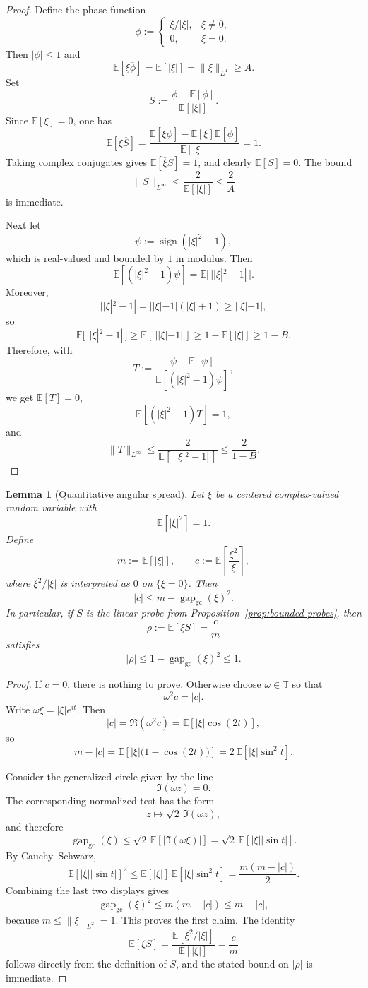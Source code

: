 \documentclass[11pt]{amsart}
\newtheorem{lemma}[theorem]{Lemma}
\newcommand{\E}{\mathbb{E}}
\newcommand{\T}{\mathbb{T}}
\newcommand{\gapgc}{\operatorname{gap}_{\mathrm{gc}}}
\begin{document}
\begin{proof}
Define the phase function
\[
  \phi :=
  \begin{cases}
    \xi/|\xi|,& \xi\ne 0,\\
    0,& \xi=0.
  \end{cases}
\]
Then $|\phi|\le 1$ and
\[
  \E[\xi\overline{\phi}] = \E[|\xi|] = \|\xi\|_{L^1}\ge A.
\]
Set
\[
  S:=\frac{\phi-\E[\phi]}{\E[|\xi|]}.
\]
Since $\E[\xi]=0$, one has
\[
  \E[\xi\overline{S}]
  =
  \frac{\E[\xi\overline{\phi}]-\E[\xi]\E[\overline{\phi}]}{\E[|\xi|]}
  = 1.
\]
Taking complex conjugates gives $\E[\overline{\xi}S]=1$, and clearly
$\E[S]=0$.  The bound
\[
  \|S\|_{L^\infty}\le \frac{2}{\E[|\xi|]}\le \frac{2}{A}
\]
is immediate.

Next let
\[
  \psi:=\operatorname{sign}(|\xi|^2-1),
\]
which is real-valued and bounded by $1$ in modulus.  Then
\[
  \E[(|\xi|^2-1)\psi]=\E\bigl[\,||\xi|^2-1|\,\bigr].
\]
Moreover,
\[
  ||\xi|^2-1| = ||\xi|-1|(|\xi|+1)\ge ||\xi|-1|,
\]
so
\[
  \E\bigl[\,||\xi|^2-1|\,\bigr]
  \ge
  \E[\,||\xi|-1|\,]
  \ge
  1-\E[|\xi|]
  \ge
  1-B.
\]
Therefore, with
\[
  T:=\frac{\psi-\E[\psi]}{\E[(|\xi|^2-1)\psi]},
\]
we get $\E[T]=0$,
\[
  \E[(|\xi|^2-1)T]=1,
\]
and
\[
  \|T\|_{L^\infty}
  \le
  \frac{2}{\E[\,||\xi|^2-1|\,]}
  \le
  \frac{2}{1-B}.
\]
\end{proof}

\begin{lemma}[Quantitative angular spread]
\label{lem:angular-spread}
Let $\xi$ be a centered complex-valued random variable with
\[
  \E[|\xi|^2]=1.
\]
Define
\[
  m:=\E[|\xi|],
  \qquad
  c:=\E\!\left[\frac{\xi^2}{|\xi|}\right],
\]
where $\xi^2/|\xi|$ is interpreted as $0$ on $\{\xi=0\}$.  Then
\[
  |c|\le m-\gapgc(\xi)^2.
\]
In particular, if $S$ is the linear probe from
Proposition~\ref{prop:bounded-probes}, then
\[
  \rho:=\E[\xi S]=\frac{c}{m}
\]
satisfies
\[
  |\rho|\le 1-\gapgc(\xi)^2\le 1.
\]
\end{lemma}

\begin{proof}
If $c=0$, there is nothing to prove.  Otherwise choose $\omega\in\T$ so that
\[
  \omega^2 c = |c|.
\]
Write $\omega\xi = |\xi|e^{it}$.  Then
\[
  |c|
  =
  \Re(\omega^2 c)
  =
  \E\!\left[|\xi|\cos(2t)\right],
\]
so
\[
  m-|c|
  =
  \E\!\left[|\xi|\bigl(1-\cos(2t)\bigr)\right]
  =
  2\,\E\!\left[|\xi|\sin^2 t\right].
\]

Consider the generalized circle given by the line
\[
  \Im(\omega z)=0.
\]
The corresponding normalized test has the form
\[
  z\longmapsto \sqrt2\,\Im(\omega z),
\]
and therefore
\[
  \gapgc(\xi)\le \sqrt2\,\E\!\left[|\Im(\omega\xi)|\right]
  =
  \sqrt2\,\E\!\left[|\xi||\sin t|\right].
\]
By Cauchy--Schwarz,
\[
  \E\!\left[|\xi||\sin t|\right]^2
  \le
  \E[|\xi|]\,
  \E\!\left[|\xi|\sin^2 t\right]
  =
  \frac{m(m-|c|)}{2}.
\]
Combining the last two displays gives
\[
  \gapgc(\xi)^2\le m(m-|c|)\le m-|c|,
\]
because $m\le \|\xi\|_{L^2}=1$.  This proves the first claim.  The identity
\[
  \E[\xi S]
  =
  \frac{\E[\xi^2/|\xi|]}{\E[|\xi|]}
  =
  \frac{c}{m}
\]
follows directly from the definition of $S$, and the stated bound on $|\rho|$
is immediate.
\end{proof}
\end{document}
